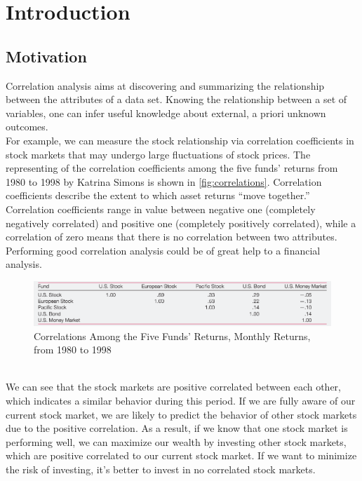 
\chapter{Introduction}
\label{ch:Introduction}
\section{Motivation}
\label{sec:Introduction:Motivation}
Correlation analysis aims at discovering and summarizing the relationship between the attributes of a data set. Knowing the relationship between a set of variables, one can infer useful knowledge about external, a priori unknown outcomes.\\
For example, we can measure the stock relationship via correlation coefficients in stock markets that may undergo large fluctuations of stock prices. The representing of the correlation coefficients among the five funds’ returns from 1980 to 1998 by Katrina Simons is shown in \autoref{fig:correlations}. Correlation coefficients describe the extent to which asset returns “move together.” Correlation coefficients range in value between negative one (completely negatively correlated) and positive one (completely positively correlated), while a correlation of zero means that there is no correlation between two attributes. Performing good correlation analysis could be of great help to a financial analysis.\\
\begin{figure}[h]
	\centering
	\includegraphics[width=\textwidth]{pictures/motivation1}
	\caption{Correlations Among the Five Funds’ Returns, Monthly Returns, from 1980 to 1998\cite{simons1999should}}
	\label{fig:correlations}
\end{figure}\\
We can see that the stock markets are positive correlated between each other, which indicates a similar behavior during this period. If we are fully aware of our current stock market, we are likely to predict the behavior of other stock markets due to the positive correlation. As a result, if we know that one stock market is performing well, we can maximize our wealth by investing other stock markets, which are positive correlated to our current stock market. If we want to minimize the risk of investing, it's better to invest in no correlated stock markets.

